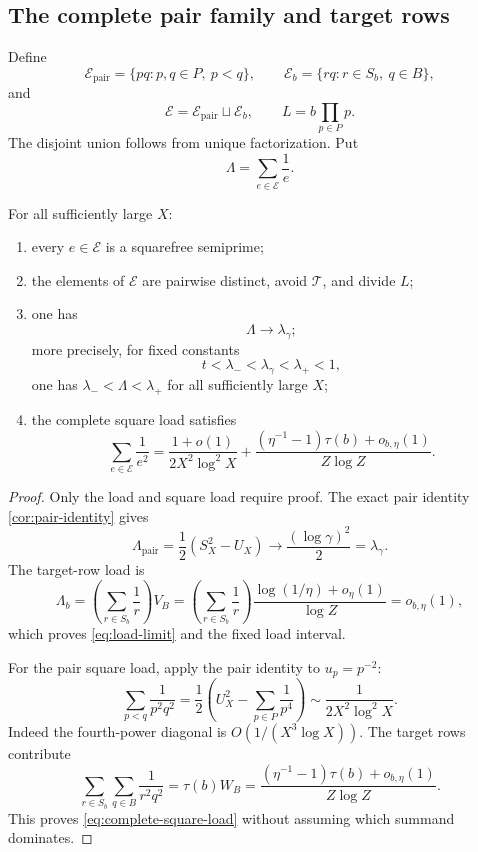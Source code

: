 \subsection{The complete pair family and target rows}

Define
\[
 \mathcal E_{\mathrm{pair}}
 =\{pq:p,q\in P,\ p<q\},
 \qquad
 \mathcal E_b
 =\{rq:r\in S_b,\ q\in B\},
\]
and
\begin{equation}
\label{eq:E-and-L}
 \mathcal E=\mathcal E_{\mathrm{pair}}\sqcup\mathcal E_b,
 \qquad
 L=b\prod_{p\in P}p.
\end{equation}
The disjoint union follows from unique factorization.  Put
\[
 \Lambda=\sum_{e\in\mathcal E}\frac1e.
\]

\begin{proposition}
\label{prop:arithmetic-capacity}
For all sufficiently large $X$:
\begin{enumerate}[label=(\roman*)]
\item every $e\in\mathcal E$ is a squarefree semiprime;
\item the elements of $\mathcal E$ are pairwise distinct, avoid $\mathcal T$, and divide $L$;
\item one has
\begin{equation}
\label{eq:load-limit}
 \Lambda\longrightarrow\lambda_\gamma;
\end{equation}
more precisely, for fixed constants
\[
 t<\lambda_-<\lambda_\gamma<\lambda_+<1,
\]
one has $\lambda_-<\Lambda<\lambda_+$ for all sufficiently large $X$;
\item the complete square load satisfies
\begin{equation}
\label{eq:complete-square-load}
 \sum_{e\in\mathcal E}\frac1{e^2}
 =\frac{1+o(1)}{2X^2\log^2X}
  +\frac{(\eta^{-1}-1)\tau(b)+o_{b,\eta}(1)}{Z\log Z}.
\end{equation}
\end{enumerate}
\end{proposition}

\begin{proof}
Only the load and square load require proof.  The exact pair identity \cref{cor:pair-identity} gives
\begin{equation}
\label{eq:pair-load}
 \Lambda_{\mathrm{pair}}
 =\frac12(S_X^2-U_X)
 \longrightarrow\frac{(\log\gamma)^2}{2}=\lambda_\gamma.
\end{equation}
The target-row load is
\[
 \Lambda_b
 =\left(\sum_{r\in S_b}\frac1r\right)V_B
 =\left(\sum_{r\in S_b}\frac1r\right)
   \frac{\log(1/\eta)+o_\eta(1)}{\log Z}
 =o_{b,\eta}(1),
\]
which proves \cref{eq:load-limit} and the fixed load interval.

For the pair square load, apply the pair identity to $u_p=p^{-2}$:
\[
 \sum_{p<q}\frac1{p^2q^2}
 =\frac12\left(U_X^2-\sum_{p\in P}\frac1{p^4}\right)
 \sim\frac1{2X^2\log^2X}.
\]
Indeed the fourth-power diagonal is $O(1/(X^3\log X))$.  The target rows contribute
\[
 \sum_{r\in S_b}\sum_{q\in B}\frac1{r^2q^2}
 =\tau(b)W_B
 =\frac{(\eta^{-1}-1)\tau(b)+o_{b,\eta}(1)}{Z\log Z}.
\]
This proves \cref{eq:complete-square-load} without assuming which summand dominates.
\end{proof}

